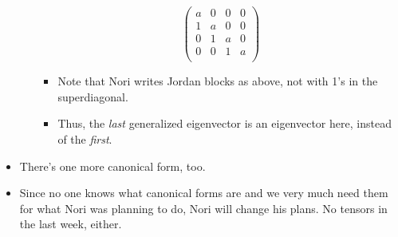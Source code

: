 \documentclass[../notes.tex]{subfiles}
\begin{document}
\begin{itemize}
\begin{itemize}
        \begin{equation*}
            \begin{pmatrix}
                a & 0 & 0 & 0\\
                1 & a & 0 & 0\\
                0 & 1 & a & 0\\
                0 & 0 & 1 & a\\
            \end{pmatrix}
        \end{equation*}
        \begin{itemize}
            \item Note that Nori writes Jordan blocks as above, not with 1's in the superdiagonal.
            \item Thus, the \emph{last} generalized eigenvector is an eigenvector here, instead of the \emph{first}.
        \end{itemize}
    \end{itemize}
    \item There's one more canonical form, too.
    \item Since no one knows what canonical forms are and we very much need them for what Nori was planning to do, Nori will change his plans. No tensors in the last week, either.
\end{itemize}
\end{document}
